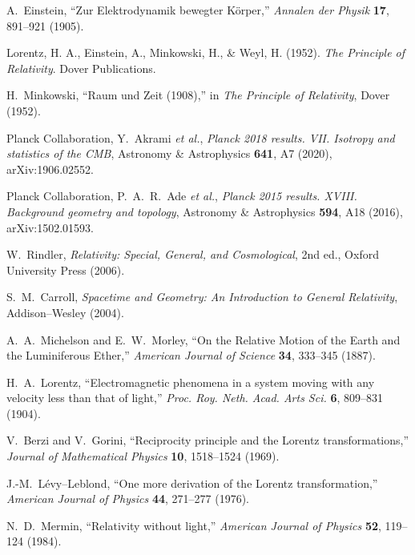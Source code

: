 \documentclass[12pt]{article}
\theoremstyle{plain}
\begin{document}
\newpage

\begin{thebibliography}{99}

A.~Einstein,
``Zur Elektrodynamik bewegter Körper,''
\emph{Annalen der Physik} \textbf{17}, 891--921 (1905).

    Lorentz, H. A., Einstein, A., Minkowski, H., \& Weyl, H. (1952). \textit{The Principle of Relativity}. Dover Publications.

H.~Minkowski,
``Raum und Zeit (1908),'' in \emph{The Principle of Relativity},
Dover (1952).

Planck Collaboration, Y.~Akrami \emph{et al.},
\emph{Planck 2018 results. VII. Isotropy and statistics of the CMB},
Astronomy \& Astrophysics \textbf{641}, A7 (2020),
arXiv:1906.02552.

Planck Collaboration, P.~A.~R.~Ade \emph{et al.},
\emph{Planck 2015 results. XVIII. Background geometry and topology},
Astronomy \& Astrophysics \textbf{594}, A18 (2016),
arXiv:1502.01593.

W.~Rindler,
\emph{Relativity: Special, General, and Cosmological}, 2nd ed.,
Oxford University Press (2006).

S.~M.~Carroll,
\emph{Spacetime and Geometry: An Introduction to General Relativity},
Addison–Wesley (2004).

A.~A.~Michelson and E.~W.~Morley,
``On the Relative Motion of the Earth and the Luminiferous Ether,''
\emph{American Journal of Science} \textbf{34}, 333--345 (1887).

H.~A.~Lorentz,
``Electromagnetic phenomena in a system moving with any velocity less than that of light,''
\emph{Proc. Roy. Neth. Acad. Arts Sci.} \textbf{6}, 809--831 (1904).

V.~Berzi and V.~Gorini,
``Reciprocity principle and the Lorentz transformations,''
\emph{Journal of Mathematical Physics} \textbf{10}, 1518--1524 (1969).

J.-M.~L\'evy–Leblond,
``One more derivation of the Lorentz transformation,''
\emph{American Journal of Physics} \textbf{44}, 271--277 (1976).

N.~D.~Mermin,
``Relativity without light,''
\emph{American Journal of Physics} \textbf{52}, 119--124 (1984).


\end{thebibliography}
\end{document}
